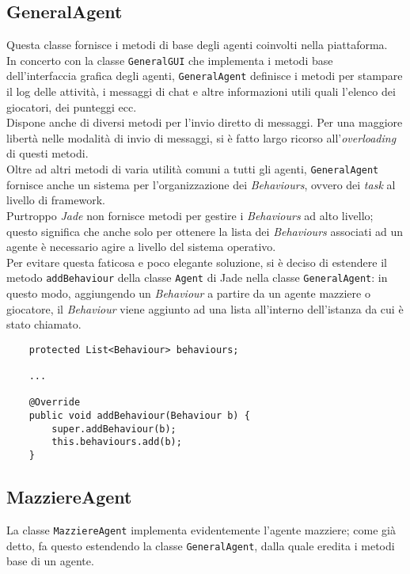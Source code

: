 \documentclass[runningheads,a4paper]{llncs}
\begin{document}
\subsection{GeneralAgent}
Questa classe fornisce i metodi di base degli agenti coinvolti nella piattaforma.\\
In concerto con la classe \texttt{GeneralGUI} che implementa i metodi base dell'interfaccia grafica degli agenti, \texttt{GeneralAgent} definisce i metodi per stampare il log delle attività, i messaggi di chat e altre informazioni utili quali l'elenco dei giocatori, dei punteggi ecc.\\
Dispone anche di diversi metodi per l'invio diretto di messaggi. Per una maggiore libertà nelle modalità di invio di messaggi, si è fatto largo ricorso all'\emph{overloading} di questi metodi.\\
Oltre ad altri metodi di varia utilità comuni a tutti gli agenti, \texttt{GeneralAgent} fornisce anche un sistema per l'organizzazione dei \emph{Behaviours}, ovvero dei \emph{task} al livello di framework.\\
Purtroppo \emph{Jade} non fornisce metodi per gestire i \emph{Behaviours} ad alto livello; questo significa che anche solo per ottenere la lista dei \emph{Behaviours} associati ad un agente è necessario agire a livello del sistema operativo.\\
Per evitare questa faticosa e poco elegante soluzione, si è deciso di estendere il metodo \texttt{addBehaviour} della classe \texttt{Agent} di Jade nella classe \texttt{GeneralAgent}: in questo modo, aggiungendo un \emph{Behaviour} a partire da un agente mazziere o giocatore, il \emph{Behaviour} viene aggiunto ad una lista all'interno dell'istanza da cui è stato chiamato.
\begin{verbatim}
    protected List<Behaviour> behaviours;
    
    ...
   
    @Override
    public void addBehaviour(Behaviour b) {
        super.addBehaviour(b);
        this.behaviours.add(b);
    }
\end{verbatim}


\subsection{MazziereAgent}

La classe \texttt{MazziereAgent} implementa evidentemente l'agente mazziere; come già detto, fa questo estendendo la classe \texttt{GeneralAgent}, dalla quale eredita i metodi base di un agente.\\
\end{document}
